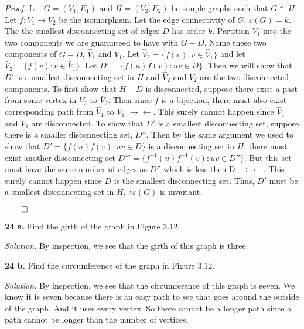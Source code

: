 \documentclass{article}
\begin{document}
\textit{Proof.} Let \(G=(V_1, E_1) \) and \(H=(V_2,E_2)\) be simple graphs such that \(G \cong H\). Let \(f:V_1 \rightarrow V_2\) be the isomorphism. Let the edge connectivity of \(G\), \( \varepsilon(G) = k \). The the smallest disconnecting set of edges \(D\) has order \(k \). Partition \(V_1\) into the two components we are guaranteed to have with \(G-D\). Name these two components of \(G-D\), \(\hat V_1\) and \(\bar V_1\). Let \( \hat V_2 = \{ f(v) : v \in \hat V_1\} \)  and let \( \bar V_2 = \{ f(v) : v \in \bar V_1\} \). Let \(D' = \{ f(u)f(v) : uv \in D \} \). Then we will show that \(D'\) is a smallest disconnecting set in \(H\) and \(\hat V_2 \) and \(\bar V_2\) are the two disconnected components. To first show that \(H-D\) is disconnected, suppose there exist a past from some vertex in \(\hat V_2\) to \(\bar V_2\). Then since \(f\) is a bijection, there must also exist corresponding path from \(\hat V_1\) to \(\bar V_1\)  \( \rightarrow\!\leftarrow\). This surely cannot happen since \(\hat V_1\) and \(\bar V_1\) are disconnected. To show that \(D'\) is a smallest disconnecting set, suppose there is a smaller disconnecting set, \(D''\). Then by the same argument we used to show that \(D' =  \{ f(u)f(v) : uv \in D \} \) is a disconnecting set in \(H\), there must exist another disconnecting set \( D''' = \{ f^{-1}(u)f^{-1}(v) : uv \in D'' \} \). But this set must have the same number of edges as \( D''\) which is less then D  \( \rightarrow\!\leftarrow\). This surely cannot happen since \(D\) is the smallest disconnecting set. Thus, \(D'\) must be a smallest disconnecting set in \(H\). \(\therefore \varepsilon(G)\) is invariant. \begin{flushright} \(\qed\) \end{flushright}
\newpage
\textbf{24 a.} Find the girth of the graph in Figure 3.12. 
\vspace{3mm}

\textit{Solution.} By inspection, we see that the girth of this graph is three. 

\vspace{4mm}

\textbf{24 b.} Find the curcumference of the graph in Figure 3.12. 
\vspace{3mm}

\textit{Solution.} By inspection, we see that the circumference of this graph is seven. We know it is seven because there is an easy path to see that goes around the outside of the graph. And it uses every vertex. So there cannot be a longer path since a path cannot be longer than the number of vertices. 
\end{document}
